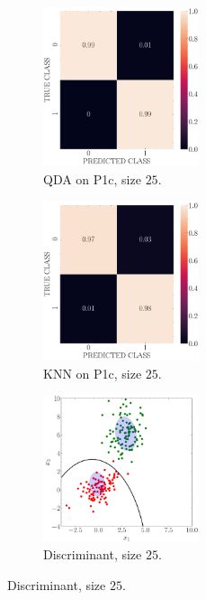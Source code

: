 \documentclass[11pt, a4 paper]{article}
\begin{document}
\begin{figure}[!htbp]
\quad    
    \begin{subfigure}[!htbp]{0.24\textwidth}
       \centering
       \includegraphics[width=1.8in]{../results/ex1/conf_mtx_QD_ML_dataset_P1c_size_25.pdf}
       \caption{QDA on P1c, size $25$.}
       \label{fig:KNN_P1c_25}
    \end{subfigure}
\quad    
    \begin{subfigure}[!htbp]{0.24\textwidth}
       \centering
       \includegraphics[width=1.8in]{../results/ex1/conf_mtx_KNN_dataset_P1c_size_25.pdf}
       \caption{KNN on P1c, size $25$.}
       \label{fig:KNN_P1c_25}
    \end{subfigure}
\quad
    \begin{subfigure}[!htbp]{0.24\textwidth}
       \centering
       \includegraphics[width=1.8in]{../results/ex1/samples_QD_ML_dataset_P1c_size_25.pdf}
       \caption{Discriminant, size $25$.}
       \label{fig:KNN_P1c_25}
    \end{subfigure}
    

\end{figure}
\end{document}
